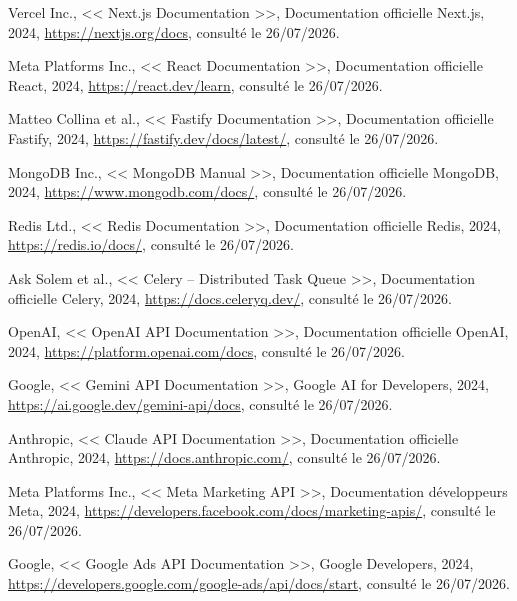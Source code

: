 \documentclass[12pt,a4paper]{report}
\numberwithin{figure}{chapter}
\numberwithin{table}{chapter}
\begin{document}
\begin{enumerate}[leftmargin=2em,itemsep=6pt,label={[\arabic*]}]
\item Vercel Inc., << Next.js Documentation >>, Documentation officielle Next.js, 2024, \url{https://nextjs.org/docs}, consulté le 26/07/2026.

\item Meta Platforms Inc., << React Documentation >>, Documentation officielle React, 2024, \url{https://react.dev/learn}, consulté le 26/07/2026.

\item Matteo Collina et al., << Fastify Documentation >>, Documentation officielle Fastify, 2024, \url{https://fastify.dev/docs/latest/}, consulté le 26/07/2026.

\item MongoDB Inc., << MongoDB Manual >>, Documentation officielle MongoDB, 2024, \url{https://www.mongodb.com/docs/}, consulté le 26/07/2026.

\item Redis Ltd., << Redis Documentation >>, Documentation officielle Redis, 2024, \url{https://redis.io/docs/}, consulté le 26/07/2026.

\item Ask Solem et al., << Celery -- Distributed Task Queue >>, Documentation officielle Celery, 2024, \url{https://docs.celeryq.dev/}, consulté le 26/07/2026.

\item OpenAI, << OpenAI API Documentation >>, Documentation officielle OpenAI, 2024, \url{https://platform.openai.com/docs}, consulté le 26/07/2026.

\item Google, << Gemini API Documentation >>, Google AI for Developers, 2024, \url{https://ai.google.dev/gemini-api/docs}, consulté le 26/07/2026.

\item Anthropic, << Claude API Documentation >>, Documentation officielle Anthropic, 2024, \url{https://docs.anthropic.com/}, consulté le 26/07/2026.

\item Meta Platforms Inc., << Meta Marketing API >>, Documentation développeurs Meta, 2024, \url{https://developers.facebook.com/docs/marketing-apis/}, consulté le 26/07/2026.

\item Google, << Google Ads API Documentation >>, Google Developers, 2024, \url{https://developers.google.com/google-ads/api/docs/start}, consulté le 26/07/2026.


\end{enumerate}
\end{document}

